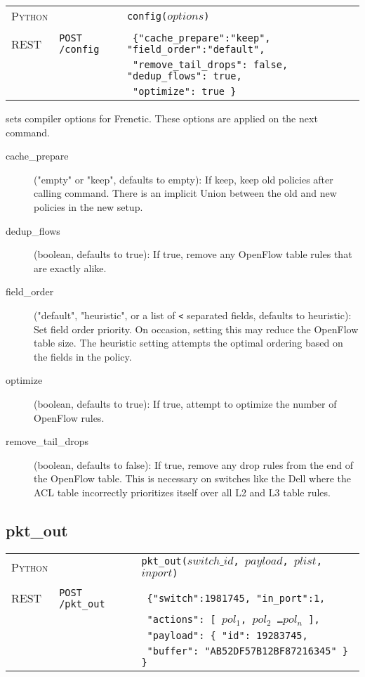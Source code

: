 \bigskip
\begin{tabularx}{\linewidth}{llX}
\textsc{Python} &  & \texttt{config($options$)} \\ \\
\textsc{REST} & \texttt{POST /config} & 
  \texttt{ \{"cache\_prepare":"keep", "field\_order":"default", } \\
  & & \texttt{ "remove\_tail\_drops": false, "dedup\_flows": true, } \\ 
  & & \texttt{ "optimize": true \} } \\ 
\end{tabularx}

 sets compiler options for Frenetic.  These options are applied on the next 
command.  

\begin{description}
\item[cache\_prepare] ("empty" or "keep", defaults to empty): If keep, keep old policies after calling  command.
There is an implicit Union between the old and new policies in the new setup.  
\item[dedup\_flows] (boolean, defaults to true): If true, remove any OpenFlow table rules that are exactly
alike.  
\item[field\_order] ("default", "heuristic", or a list of \texttt{<} separated fields, defaults to heuristic): 
  Set field order priority.  On occasion, setting this may reduce the OpenFlow table size.
  The heuristic setting attempts the optimal ordering based on the fields in the policy.
\item[optimize] (boolean, defaults to true): If true, attempt to optimize the number of OpenFlow rules.
\item[remove\_tail\_drops] (boolean, defaults to false): If true, remove any drop rules from the end of the
OpenFlow table.  This is necessary on switches like the Dell where the ACL table incorrectly prioritizes
itself over all L2 and L3 table rules.
\end{description}

\subsection{pkt\_out}

\bigskip
\begin{tabularx}{\linewidth}{llX}
\textsc{Python} &  & \texttt{pkt\_out($switch\_id$, $payload$, $plist$, $inport$)} \\ \\
\textsc{REST} & \texttt{POST /pkt\_out} & 
  \texttt{ \{"switch":1981745, "in\_port":1, } \\
  & & \texttt{ "actions": [ $pol_1$, $pol_2$ \ldots $pol_n$ ], } \\ 
  & & \texttt{ "payload": \{ "id": 19283745, }\\
  & & \texttt{ "buffer": "AB52DF57B12BF87216345" \} \} } 
\end{tabularx}

